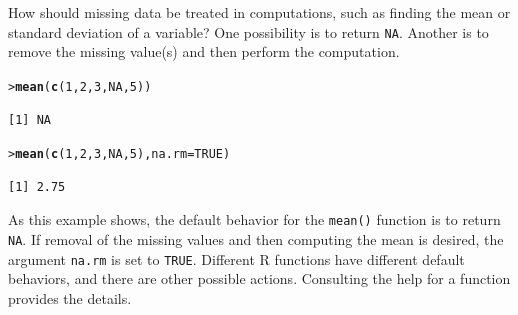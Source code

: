 \documentclass[12pt,oneside]{book}\usepackage[]{graphicx}\usepackage[]{color}
\makeatletter
\newcommand{\hlnum}[1]{\textcolor[rgb]{0.686,0.059,0.569}{#1}}%
\newcommand{\hlstd}[1]{\textcolor[rgb]{0.345,0.345,0.345}{#1}}%
\newcommand{\hlkwc}[1]{\textcolor[rgb]{0.333,0.667,0.333}{#1}}%
\newcommand{\hlkwd}[1]{\textcolor[rgb]{0.737,0.353,0.396}{\textbf{#1}}}%
\newenvironment{kframe}{%
 \def\at@end@of@kframe{}%
 \ifinner\ifhmode%
  \def\at@end@of@kframe{\end{minipage}}%
  \begin{minipage}{\columnwidth}%
 \fi\fi%
 \def\FrameCommand##1{\hskip\@totalleftmargin \hskip-\fboxsep
 \colorbox{shadecolor}{##1}\hskip-\fboxsep
     \hskip-\linewidth \hskip-\@totalleftmargin \hskip\columnwidth}%
 \MakeFramed {\advance\hsize-\width
   \@totalleftmargin\z@ \linewidth\hsize
   \@setminipage}}%
 {\par\unskip\endMakeFramed%
 \at@end@of@kframe}
\newenvironment{knitrout}{}{} %
\makeatother
\begin{document}
How should missing data be treated in computations, such as finding the mean or standard deviation of a variable? One possibility is to return \verb+NA+. Another is to remove the missing value(s) and then perform the computation.
\begin{knitrout}
\color{fgcolor}\begin{kframe}
\begin{alltt}
\hlstd{> }\hlkwd{mean}\hlstd{(}\hlkwd{c}\hlstd{(}\hlnum{1}\hlstd{,} \hlnum{2}\hlstd{,} \hlnum{3}\hlstd{,} \hlnum{NA}\hlstd{,} \hlnum{5}\hlstd{))}
\end{alltt}
\begin{verbatim}
[1] NA
\end{verbatim}
\begin{alltt}
\hlstd{> }\hlkwd{mean}\hlstd{(}\hlkwd{c}\hlstd{(}\hlnum{1}\hlstd{,} \hlnum{2}\hlstd{,} \hlnum{3}\hlstd{,} \hlnum{NA}\hlstd{,} \hlnum{5}\hlstd{),} \hlkwc{na.rm} \hlstd{=} \hlnum{TRUE}\hlstd{)}
\end{alltt}
\begin{verbatim}
[1] 2.75
\end{verbatim}
\end{kframe}
\end{knitrout}
As this example shows, the default behavior for the \verb+mean()+ function is to return \verb+NA+. If removal of the missing values and then computing the mean is desired, the argument \verb+na.rm+ is set to \verb+TRUE+. Different R functions have different default behaviors, and there are other possible actions. Consulting the help for a function provides the details.
\end{document}
